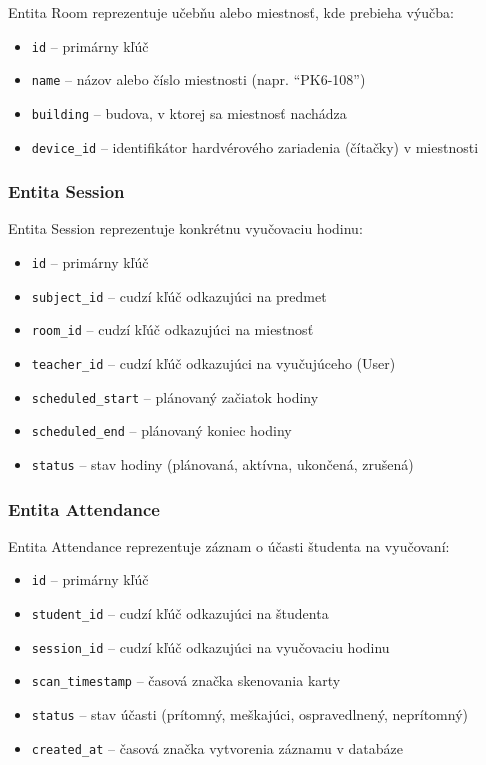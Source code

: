 Entita Room reprezentuje učebňu alebo miestnosť, kde prebieha výučba:

\begin{itemize}
    \item \texttt{id} -- primárny kľúč
    \item \texttt{name} -- názov alebo číslo miestnosti (napr. ``PK6-108'')
    \item \texttt{building} -- budova, v ktorej sa miestnosť nachádza
    \item \texttt{device\_id} -- identifikátor hardvérového zariadenia (čítačky) v miestnosti
\end{itemize}

\subsubsection{Entita Session}

Entita Session reprezentuje konkrétnu vyučovaciu hodinu:

\begin{itemize}
    \item \texttt{id} -- primárny kľúč
    \item \texttt{subject\_id} -- cudzí kľúč odkazujúci na predmet
    \item \texttt{room\_id} -- cudzí kľúč odkazujúci na miestnosť
    \item \texttt{teacher\_id} -- cudzí kľúč odkazujúci na vyučujúceho (User)
    \item \texttt{scheduled\_start} -- plánovaný začiatok hodiny
    \item \texttt{scheduled\_end} -- plánovaný koniec hodiny
    \item \texttt{status} -- stav hodiny (plánovaná, aktívna, ukončená, zrušená)
\end{itemize}

\subsubsection{Entita Attendance}

Entita Attendance reprezentuje záznam o účasti študenta na vyučovaní:

\begin{itemize}
    \item \texttt{id} -- primárny kľúč
    \item \texttt{student\_id} -- cudzí kľúč odkazujúci na študenta
    \item \texttt{session\_id} -- cudzí kľúč odkazujúci na vyučovaciu hodinu
    \item \texttt{scan\_timestamp} -- časová značka skenovania karty
    \item \texttt{status} -- stav účasti (prítomný, meškajúci, ospravedlnený, neprítomný)
    \item \texttt{created\_at} -- časová značka vytvorenia záznamu v databáze
\end{itemize}

